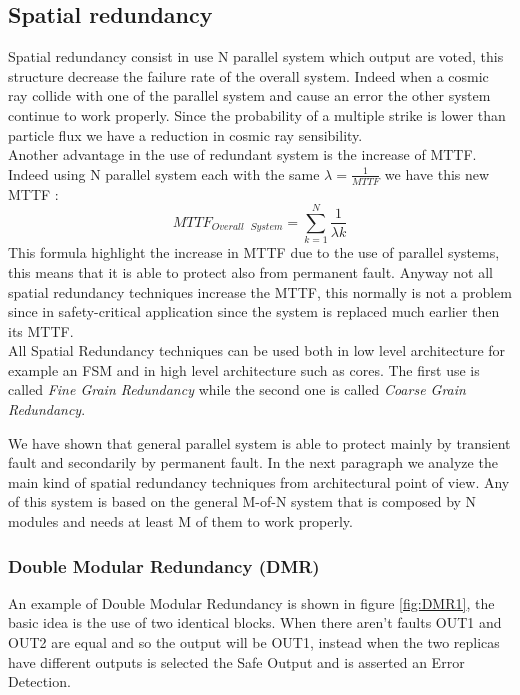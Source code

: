 {{		\subsection{Spatial redundancy}{
		    Spatial redundancy consist in use N parallel system which output are voted, this structure decrease the failure rate of the overall system. Indeed when a cosmic ray collide with one of the parallel system and cause an error the other system continue to work properly. Since the probability of a multiple strike is lower than particle flux we have a reduction in cosmic ray sensibility. \\
		   
		    Another advantage in the use of redundant system is the increase of MTTF. Indeed using N parallel system each with the same $\lambda=\frac{1}{MTTF}$ we have this new MTTF :
		    \begin{equation}
		         MTTF_{Overall\,\,\,\,System} = \sum_{k=1}^{N} \dfrac{1}{\lambda k}
		    \end{equation} 
		    This formula highlight the increase in MTTF due to the use of parallel systems, this means that it is able to protect also from permanent fault. Anyway not all spatial redundancy techniques increase the MTTF, this normally is not a problem since in safety-critical application since the system is replaced much earlier then its MTTF. \\
		    
		    All Spatial Redundancy techniques can be used both in low level architecture for example an FSM and in high level architecture such as cores. The first use is called \textit{Fine Grain Redundancy} while the second one is called \textit{Coarse Grain Redundancy}.  
		   
		    We have shown that general parallel system is able to protect mainly by transient fault and secondarily by permanent fault. In the next paragraph we analyze the main kind of spatial redundancy techniques from architectural point of view. Any of this system is based on the general M-of-N system that is composed by N modules and needs at least M of them to work properly.
		    
		    \subsubsection{Double Modular Redundancy (DMR)}{
		        An example of Double Modular Redundancy is shown in figure \ref{fig:DMR1}, the basic idea is the use of two identical blocks. When there aren't faults OUT1 and OUT2 are equal and so the output will be OUT1, instead when the two replicas have different outputs is selected the Safe Output and is asserted an Error Detection. 
		        
}}}}
